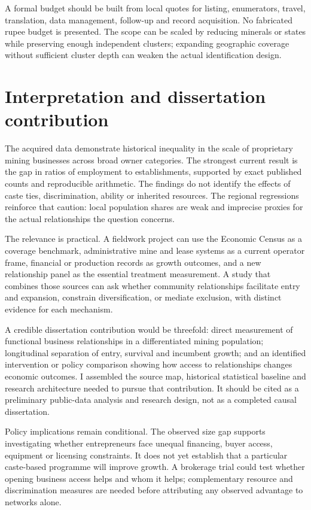 \documentclass[11pt,a4paper]{report}
\begin{document}
A formal budget should be built from local quotes for listing, enumerators, travel, translation, data management, follow-up and record acquisition. No fabricated rupee budget is presented. The scope can be scaled by reducing minerals or states while preserving enough independent clusters; expanding geographic coverage without sufficient cluster depth can weaken the actual identification design.

\chapter{Interpretation and dissertation contribution}
The acquired data demonstrate historical inequality in the scale of proprietary mining businesses across broad owner categories. The strongest current result is the gap in ratios of employment to establishments, supported by exact published counts and reproducible arithmetic. The findings do not identify the effects of caste ties, discrimination, ability or inherited resources. The regional regressions reinforce that caution: local population shares are weak and imprecise proxies for the actual relationships the question concerns.

The relevance is practical. A fieldwork project can use the Economic Census as a coverage benchmark, administrative mine and lease systems as a current operator frame, financial or production records as growth outcomes, and a new relationship panel as the essential treatment measurement. A study that combines those sources can ask whether community relationships facilitate entry and expansion, constrain diversification, or mediate exclusion, with distinct evidence for each mechanism.

A credible dissertation contribution would be threefold: direct measurement of functional business relationships in a differentiated mining population; longitudinal separation of entry, survival and incumbent growth; and an identified intervention or policy comparison showing how access to relationships changes economic outcomes. I assembled the source map, historical statistical baseline and research architecture needed to pursue that contribution. It should be cited as a preliminary public-data analysis and research design, not as a completed causal dissertation.

Policy implications remain conditional. The observed size gap supports investigating whether entrepreneurs face unequal financing, buyer access, equipment or licensing constraints. It does not yet establish that a particular caste-based programme will improve growth. A brokerage trial could test whether opening business access helps and whom it helps; complementary resource and discrimination measures are needed before attributing any observed advantage to networks alone.
\end{document}
